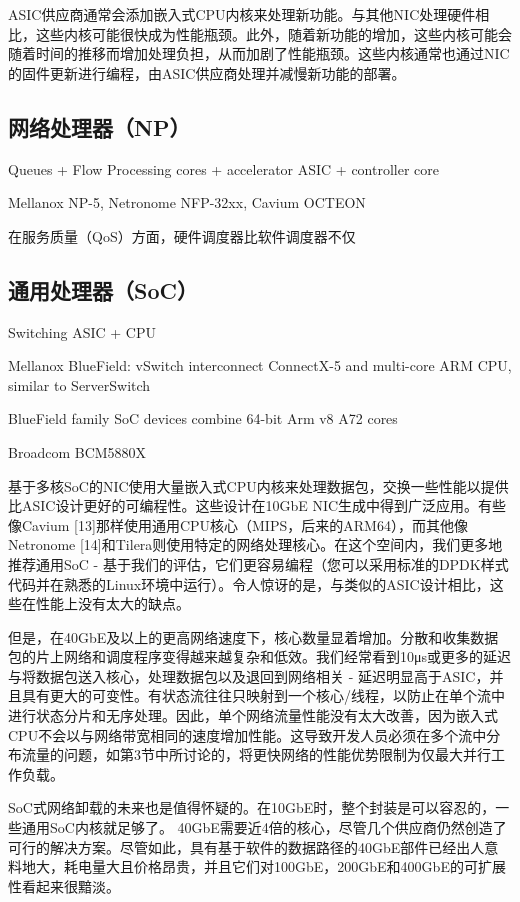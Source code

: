 ASIC供应商通常会添加嵌入式CPU内核来处理新功能。与其他NIC处理硬件相比，这些内核可能很快成为性能瓶颈。此外，随着新功能的增加，这些内核可能会随着时间的推移而增加处理负担，从而加剧了性能瓶颈。这些内核通常也通过NIC的固件更新进行编程，由ASIC供应商处理并减慢新功能的部署。


\subsection{网络处理器（NP）}
\label{smartnic-np}

Queues + Flow Processing cores + accelerator ASIC + controller core

Mellanox NP-5, Netronome NFP-32xx, Cavium OCTEON

在服务质量（QoS）方面，硬件调度器比软件调度器不仅 \cite{kaffes2019shinjuku,ousterhout2019shenango}


\subsection{通用处理器（SoC）}
\label{smartnic-soc}

Switching ASIC + CPU

Mellanox BlueField: vSwitch interconnect ConnectX-5 and multi-core ARM CPU, similar to ServerSwitch

BlueField family SoC devices combine 64-bit Arm v8 A72 cores

Broadcom BCM5880X


基于多核SoC的NIC使用大量嵌入式CPU内核来处理数据包，交换一些性能以提供比ASIC设计更好的可编程性。这些设计在10GbE NIC生成中得到广泛应用。有些像Cavium [13]那样使用通用CPU核心（MIPS，后来的ARM64），而其他像Netronome [14]和Tilera则使用特定的网络处理核心。在这个空间内，我们更多地推荐通用SoC  - 基于我们的评估，它们更容易编程（您可以采用标准的DPDK样式代码并在熟悉的Linux环境中运行）。令人惊讶的是，与类似的ASIC设计相比，这些在性能上没有太大的缺点。

但是，在40GbE及以上的更高网络速度下，核心数量显着增加。分散和收集数据包的片上网络和调度程序变得越来越复杂和低效。我们经常看到10μs或更多的延迟与将数据包送入核心，处理数据包以及退回到网络相关 - 延迟明显高于ASIC，并且具有更大的可变性。有状态流往往只映射到一个核心/线程，以防止在单个流中进行状态分片和无序处理。因此，单个网络流量性能没有太大改善，因为嵌入式CPU不会以与网络带宽相同的速度增加性能。这导致开发人员必须在多个流中分布流量的问题，如第3节中所讨论的，将更快网络的性能优势限制为仅最大并行工作负载。

SoC式网络卸载的未来也是值得怀疑的。在10GbE时，整个封装是可以容忍的，一些通用SoC内核就足够了。 40GbE需要近4倍的核心，尽管几个供应商仍然创造了可行的解决方案。尽管如此，具有基于软件的数据路径的40GbE部件已经出人意料地大，耗电量大且价格昂贵，并且它们对100GbE，200GbE和400GbE的可扩展性看起来很黯淡。

